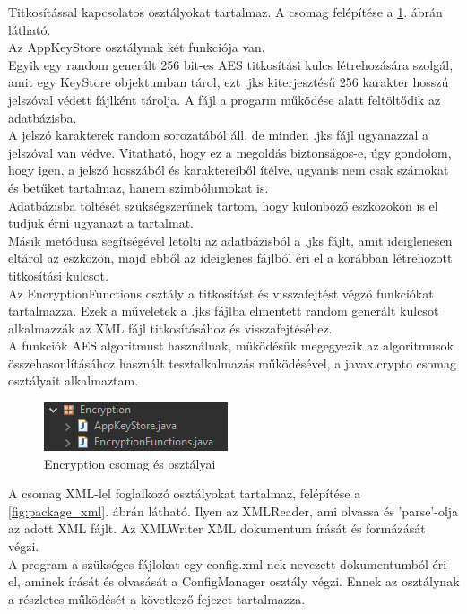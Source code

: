 Titkosítással kapcsolatos osztályokat tartalmaz. A csomag felépítése a \ref{fig:package_encryption}. ábrán látható.
\vspace{5pt}\\Az AppKeyStore osztálynak két funkciója van. 
\\Egyik egy random generált 256 bit-es AES titkosítási kulcs létrehozására szolgál, amit egy KeyStore objektumban tárol, ezt .jks kiterjesztésű 256 karakter hosszú jelszóval védett fájlként tárolja. A fájl a progarm működése alatt feltöltődik az adatbázisba.
\\A jelszó karakterek random sorozatából áll, de minden .jks fájl ugyanazzal a jelszóval van védve. Vitatható, hogy ez a megoldás biztonságos-e, úgy gondolom, hogy igen, a jelszó hosszából és karaktereiből ítélve, ugyanis nem csak számokat és betűket tartalmaz, hanem szimbólumokat is.
\\Adatbázisba töltését szükségszerűnek tartom, hogy különböző eszközökön is el tudjuk érni ugyanazt a tartalmat.
\\Másik metódusa segítségével letölti az adatbázisból a .jks fájlt, amit ideiglenesen eltárol az eszközön, majd ebből az ideiglenes fájlból éri el a korábban létrehozott titkosítási kulcsot.
\vspace{5pt}\\Az EncryptionFunctions osztály a titkosítást és visszafejtést végző funkciókat tartalmazza. Ezek a műveletek a .jks fájlba elmentett random generált kulcsot alkalmazzák az XML fájl titkosításához és visszafejtéséhez.
\\A funkciók AES algoritmust használnak, működésük megegyezik az algoritmusok összehasonlításához használt tesztalkalmazás működésével, a javax.crypto csomag osztályait alkalmaztam.

\begin{figure}[h]
	\centering
	\includegraphics[scale=0.7]{images/package_encryption.png}
	\caption{Encryption csomag és osztályai}
	\label{fig:package_encryption}
\end{figure}

A csomag XML-lel foglalkozó osztályokat tartalmaz, felépítése a \ref{fig:package_xml}. ábrán látható. Ilyen az XMLReader, ami olvassa és 'parse'-olja az adott XML fájlt. Az XMLWriter XML dokumentum írását és formázását végzi.
\vspace{5pt}\\A program a szükséges fájlokat egy config.xml-nek nevezett dokumentumból éri el, aminek írását és olvasását a ConfigManager osztály végzi. Ennek az osztálynak a részletes működését a következő fejezet tartalmazza.


